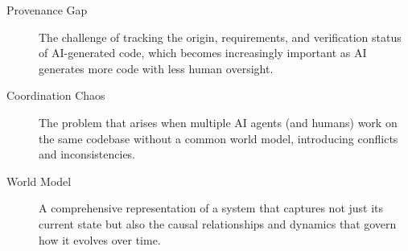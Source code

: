 \begin{description}
\item[Provenance Gap] The challenge of tracking the origin, requirements, and verification status of AI-generated code, which becomes increasingly important as AI generates more code with less human oversight.

\item[Coordination Chaos] The problem that arises when multiple AI agents (and humans) work on the same codebase without a common world model, introducing conflicts and inconsistencies.

\item[World Model] A comprehensive representation of a system that captures not just its current state but also the causal relationships and dynamics that govern how it evolves over time.
\end{description}
